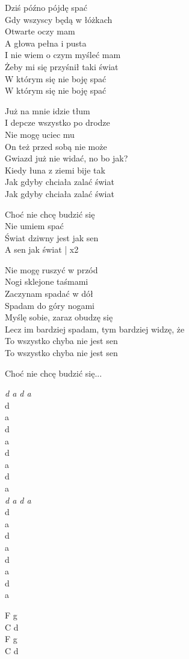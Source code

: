 \begin{text}
    \hfill\break
    Dziś późno pójdę spać\\
    Gdy wszyscy będą w łóżkach\\
    Otwarte oczy mam\\
    A głowa pełna i pusta\\
    I nie wiem o czym myśleć mam\\
    Żeby mi się przyśnił taki świat\\
    W którym się nie boję spać\\
    W którym się nie boję spać

    Już na mnie idzie tłum\\
    I depcze wszystko po drodze\\
    Nie mogę uciec mu\\
    On też przed sobą nie może\\
    Gwiazd już nie widać, no bo jak?\\
    Kiedy łuna z ziemi bije tak\\
    Jak gdyby chciała zalać świat\\
    Jak gdyby chciała zalać świat

    \vin Choć nie chcę budzić się\\
    \vin Nie umiem spać\\
    \vin Świat dziwny jest jak sen\\
    \vin A sen jak świat | x2

    Nie mogę ruszyć w przód\\
    Nogi sklejone taśmami\\
    Zaczynam spadać w dół\\
    Spadam do góry nogami\\
    Myślę sobie, zaraz obudzę się\\
    Lecz im bardziej spadam, tym bardziej widzę, że\\
    To wszystko chyba nie jest sen\\
    To wszystko chyba nie jest sen
    
    \vin Choć nie chcę budzić się...
\end{text}
\begin{chord}
    \textit{d a d a}\\
    d\\
    a\\
    d\\
    a\\
    d\\
    a\\    
    d\\
    a\\
    \textit{d a d a}\\
    d\\
    a\\
    d\\
    a\\
    d\\
    a\\    
    d\\
    a
    
    F g\\
    C d\\
    F g\\
    C d
    
\end{chord}